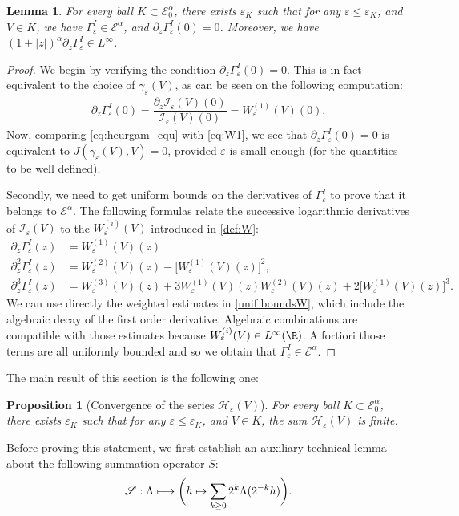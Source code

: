 \documentclass[JEP,XML,SOM,Unicode]{cedram}
\let\mathcal\mathscr
\def\mto{\mathchoice{\longmapsto}{\mapsto}{\mapsto}{\mapsto}}
\newcommand{\cI}{\mathcal{I}}
\newcommand{\cS}{\mathcal{S}}
\theoremstyle{plain}
\newtheorem{lem}[thm]{Lemma}
\newtheorem{prop}[thm]{Proposition}
\theoremstyle{definition}
\renewcommand{\H}{\mathcal{H}_\eps}
\let\eps\varepsilon
\newcommand{\Ea}{\mathcal{E}^\alpha}
\newcommand{\Eaz}{\mathcal{E}^\alpha_0}
\newcommand{\GammaI}{\Gamma^I_{\eps}}
\begin{document}
\begin{lem}\label{cond log Ieps Eaz}
For every ball $K\subset \Eaz$, there exists $\eps_K$ such that for any $\eps \leq \eps_K$, and $V\in K$, we have $\GammaI\in \Ea$, and $\partial_z \GammaI (0) = 0$. Moreover, we have $(1+|z|)^\alpha\partial_z \GammaI \in L^\infty$.
\end{lem}
\begin{proof}
We begin by verifying the condition $\partial_z \GammaI (0) = 0$. This is in fact equivalent to the choice of $\gamma_\eps(V)$, as can be seen on the following computation:
\begin{align*}
\partial_z \GammaI(0)= \dfrac{\partial_z \cI_\eps(V)(0)}{\cI_\eps(V)(0)} = W_\eps^{(1)}(V)(0).
\end{align*}
Now, comparing \eqref{eq:heurgam_equ} with \eqref{eq:W1}, we see that $\partial_z \GammaI(0) = 0$ is equivalent to $J(\gamma_\eps(V),V) = 0$, provided $\eps$ is small enough (for the quantities to be well defined).

Secondly, we need to get uniform bounds on the derivatives of $\GammaI$ to prove that it belongs to $\Ea$. The following formulas relate the successive logarithmic derivatives of $\cI_\eps(V)$ to the $W_\eps^{(i)}(V)$ introduced in \cref{def:W}:
\begin{align}
\partial_z \GammaI(z) & = W_\eps^{(1)}(V)(z) \label{eq:pz gammaI}\\
\partial_z^2 \GammaI(z) & = W_\eps^{(2)}(V)(z) - \bigl [W_\eps^{(1)}(V)(z) \bigr ]^2, \label{eq:pz2 gammaI}\\
\partial_z^3 \GammaI(z) & = W_\eps^{(3)}(V)(z) + 3W_\eps^{(1)}(V)(z)W_\eps^{(2)}(V)(z) +2 \bigl [W_\eps^{(1)}(V)(z) \bigr ]^3. \label{eq:pz3 gammaI}
\end{align}
We can use directly the weighted estimates in \cref{unif boundsW}, which include the algebraic decay of the first order derivative. Algebraic combinations are compatible with those estimates because $W_\eps^{(i)}(V) \in L^\infty(\R)$.
A fortiori those terms are all uniformly bounded and so we obtain that $\GammaI\in \Ea$.
\end{proof}

The main result of this section is the following one:
\begin{prop}[Convergence of the series $\H(V)$]\label{finiteness Heps}
For every ball $K\subset \Eaz$, there exists $\eps_K$ such that for any $\eps \leq \eps_K$, and $V\in K$, the sum $\H(V)$ is finite.
\end{prop}
Before proving this statement, we first establish an auxiliary technical lemma about the following summation operator $S$:
\begin{equation*}
\cS: \Lambda \mto \biggl(h \mapsto \sum_{k \geq 0} 2^k \Lambda	 (2^{-k}h) \biggr).
\end{equation*}
\end{document}
